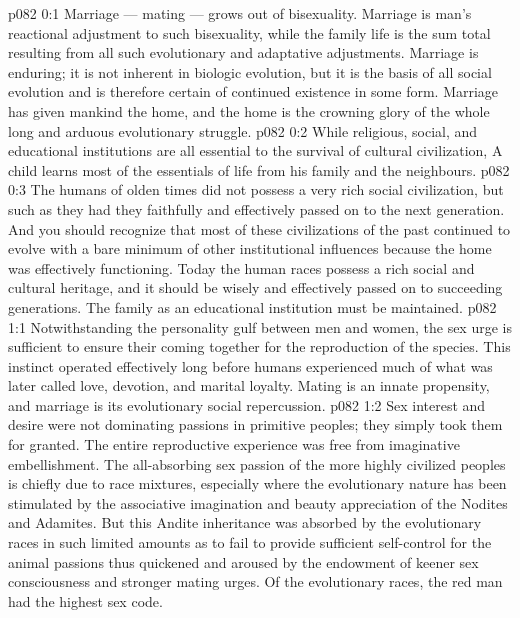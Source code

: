 \author{Chief of Seraphim}
\vs p082 0:1 Marriage --- mating --- grows out of bisexuality. Marriage is man’s reactional adjustment to such bisexuality, while the family life is the sum total resulting from all such evolutionary and adaptative adjustments. Marriage is enduring; it is not inherent in biologic evolution, but it is the basis of all social evolution and is therefore certain of continued existence in some form. Marriage has given mankind the home, and the home is the crowning glory of the whole long and arduous evolutionary struggle.
\vs p082 0:2 While religious, social, and educational institutions are all essential to the survival of cultural civilization,  A child learns most of the essentials of life from his family and the neighbours.
\vs p082 0:3 The humans of olden times did not possess a very rich social civilization, but such as they had they faithfully and effectively passed on to the next generation. And you should recognize that most of these civilizations of the past continued to evolve with a bare minimum of other institutional influences because the home was effectively functioning. Today the human races possess a rich social and cultural heritage, and it should be wisely and effectively passed on to succeeding generations. The family as an educational institution must be maintained.
\vs p082 1:1 Notwithstanding the personality gulf between men and women, the sex urge is sufficient to ensure their coming together for the reproduction of the species. This instinct operated effectively long before humans experienced much of what was later called love, devotion, and marital loyalty. Mating is an innate propensity, and marriage is its evolutionary social repercussion.
\vs p082 1:2 Sex interest and desire were not dominating passions in primitive peoples; they simply took them for granted. The entire reproductive experience was free from imaginative embellishment. The all\hyp{}absorbing sex passion of the more highly civilized peoples is chiefly due to race mixtures, especially where the evolutionary nature has been stimulated by the associative imagination and beauty appreciation of the Nodites and Adamites. But this Andite inheritance was absorbed by the evolutionary races in such limited amounts as to fail to provide sufficient self\hyp{}control for the animal passions thus quickened and aroused by the endowment of keener sex consciousness and stronger mating urges. Of the evolutionary races, the red man had the highest sex code.
